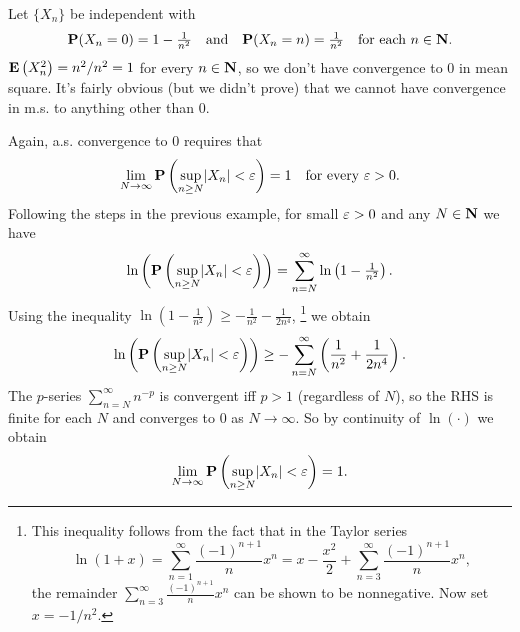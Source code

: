 \documentclass[11pt,letterpaper,reqno,oneside]{article}
\begin{document}
\begin{example}
	Let $\{ X_n \}$ be independent with
	\begin{equation*}
		\mathbf{P}(X_n=0) = 1-\tfrac{1}{n^2} 
		\quad\text{and}\quad
		\mathbf{P}(X_n=n) = \tfrac{1}{n^2}
		\quad\text{for each $n \in \mathbf{N}$.}
	\end{equation*}
	$\mathbf{E}\left( X_n^2 \right) = n^2 / n^2 = 1$ for every $n \in \mathbf{N}$, so we don't have convergence to $0$ in mean square. It's fairly obvious (but we didn't prove) that we cannot have convergence in m.s. to anything other than $0$.

 	Again, a.s. convergence to $0$ requires that
	\begin{equation*}
		\lim_{N\to\infty} \mathbf{P}\left( \sup_{n \geq N} \lvert X_n\rvert < \varepsilon \right) = 1 
		\quad\text{for every $\varepsilon>0$.}
	\end{equation*}
	Following the steps in the previous example, for small $\varepsilon>0$ and any $N \in \mathbf{N}$ we have
	\begin{equation*}
		\ln\left( \mathbf{P}\left( \sup_{n \geq N} \lvert X_n\rvert < \varepsilon \right) \right)
		= \sum_{n=N}^\infty \ln \left( 1 - \tfrac{1}{n^2} \right) .
	\end{equation*}
	Using the inequality $\ln \left( 1 - \tfrac{1}{n^2} \right) \geq -\tfrac{1}{n^2} - \tfrac{1}{2n^4}$,%
		\footnote{This inequality follows from the fact that in the Taylor series
		\begin{equation*}
			\ln(1+x) 
			= \sum_{n=1}^\infty \frac{(-1)^{n+1}}{n} x^n 
			= x - \frac{x^2}{2} + \sum_{n=3}^\infty \frac{(-1)^{n+1}}{n} x^n ,
		\end{equation*}
		the remainder $\sum_{n=3}^\infty \frac{(-1)^{n+1}}{n} x^n$ can be shown to be nonnegative. Now set $x=-1/n^2$.}
	we obtain
	\begin{equation*}
		\ln\left( \mathbf{P}\left( \sup_{n \geq N} \lvert X_n\rvert < \varepsilon \right) \right)
		\geq - \sum_{n=N}^\infty \left( \frac{1}{n^2} + \frac{1}{2n^4} \right) .
	\end{equation*}
	The $p$-series $\sum_{n=N}^\infty n^{-p}$ is convergent iff $p>1$ (regardless of $N$), so the RHS is finite for each $N$ and converges to $0$ as $N\to\infty$. So by continuity of $\ln(\cdot)$ we obtain
	\begin{equation*}
		\lim_{N\to\infty} \mathbf{P}\left( \sup_{n \geq N} \lvert X_n\rvert < \varepsilon \right) = 1 .
	\end{equation*}
\end{example}

\end{document}
